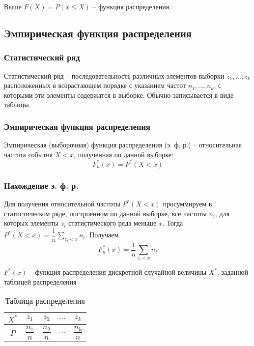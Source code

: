 \documentclass[12pt]{article}
\begin{document}
	Выше $F(X) = P(x \leq X)$ -- функция распределения.
	
	\subsection{Эмпирическая функция распределения}
	
	\subsubsection{Статистический ряд}
	
	Статистический ряд – последовательность различных элементов выборки $z_1,\dots,z_k$ расположенных в возрастающем порядке с указанием частот $n_1,\dots,n_k$, с которыми эти элементы содержатся в выборке. Обычно записывается в виде таблицы.
	
	\subsubsection{Эмпирическая функция распределения}
	
	Эмпирическая (выборочная) функция распределения (э. ф. р.) – относительная частота события $X < x$, полученная по данной выборке:
	\begin{equation}
		F^*_n(x) = P^*(X < x)
	\end{equation}
	
	\subsubsection{Нахождение э. ф. р.}
	
	Для получения относительной частоты $P^*(X < x)$ просуммируем в статистическом ряде, построенном по данной выборке, все частоты $n_i$, для которых элементы $z_i$ статистического ряда меньше $x$. Тогда $P^*(X < x) = \dfrac{1}{n}\sum\limits_{z_i < x}n_i$. Получаем
	\begin{equation}
		F^*_n(x) = \dfrac{1}{n}\sum\limits_{z_i < x}n_i
	\end{equation}

	$F^*(x)$ -- функция распределения дискретной случайной величины $X^*$, заданной таблицей распределения
	\begin{table}
		\centering
		\begin{tabular}{|c|c|c|c|c|} \hline
			$X^*$ & $z_1$ & $z_2$ & $\dots$ & $z_k$ \\ \hline
			\rule{0pt}{15pt}$P$ & $\dfrac{n_1}{n}$ & $\dfrac{n_2}{n}$ & $\dots$ & $\dfrac{n_k}{n}$ \\ \hline
		\end{tabular}
		\caption{Таблица распределения}
	\end{table}
\end{document}
